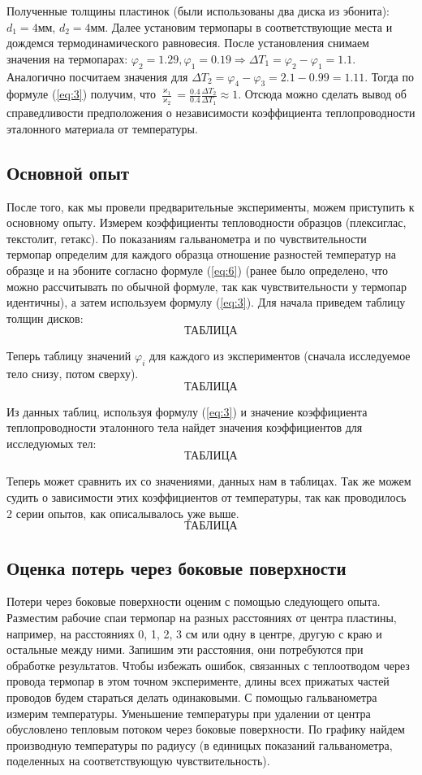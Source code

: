 \documentclass[a4paper,11.5pt]{article} %
\begin{document}
Полученные толщины пластинок (были использованы два диска из эбонита): $d_1 = 4 \textbf{мм}$, $d_2 = 4 \textbf{мм}$. Далее установим термопары в соответствующие места и дождемся термодинамического равновесия. После установления снимаем значения на термопарах: $\varphi_2 = 1.29, \varphi_1 = 0.19 \Rightarrow \Delta T_1 = \varphi_2 - \varphi_1 = 1.1$. Аналогично посчитаем значения для $\Delta T_2 = \varphi_4 - \varphi_3 = 2.1 - 0.99 = 1.11$. Тогда по формуле (\ref{eq:3}) получим, что $\frac{\varkappa_1}{\varkappa_2} = \frac{0.4}{0.4}\frac{\Delta T_2}{\Delta T_1} \approx 1.$ Отсюда можно сделать вывод об справедливости предположения о независимости коэффициента теплопроводности эталонного материала от температуры.  
\subsection{Основной опыт}
После того, как мы провели предварительные эксперименты, можем приступить к основному опыту. Измерем коэффициенты тепловодности образцов (плексиглас, текстолит, гетакс). По показаниям гальванометра и по чувствительности термопар определим для каждого образца отношение разностей температур на образце и на эбоните согласно формуле (\ref{eq:6}) (ранее было определено, что можно рассчитывать по обычной формуле, так как чувствительности у термопар идентичны), а затем используем формулу (\ref{eq:3}).
Для начала приведем таблицу толщин дисков:
\[\textbf{ТАБЛИЦА}\]

Теперь таблицу значений $\varphi_i$ для каждого из экспериментов (сначала исследуемое тело снизу, потом сверху).
\[\textbf{ТАБЛИЦА}\]

Из данных таблиц, используя формулу (\ref{eq:3}) и значение коэффициента теплопроводности эталонного тела найдет значения коэффициентов для исследуюмых тел:
\[\textbf{ТАБЛИЦА}\]

Теперь может сравнить их со значениями, данных нам в таблицах. Так же можем судить о зависимости этих коэффициентов от температуры, так как проводилось 2 серии опытов, как описалывалось уже выше.
\[\textbf{ТАБЛИЦА}\]


\subsection{Оценка потерь через боковые поверхности}
Потери через боковые поверхности оценим с помощью следующего опыта. Разместим рабочие спаи термопар на разных расстояниях от центра пластины, например, на расстояниях 0, 1, 2, 3 см или одну в центре, другую с краю и остальные между ними. Запишим эти расстояния, они потребуются при обработке результатов. Чтобы избежать ошибок, связанных с теплоотводом через провода термопар в этом точном эксперименте, длины всех прижатых частей проводов будем стараться делать одинаковыми. С помощью гальванометра измерим температуры. Уменьшение температуры при удалении от центра обусловлено тепловым потоком через боковые поверхности. По графику найдем производную температуры по радиусу (в единицых показаний гальванометра, поделенных на соответствующую чувствительность).
\end{document}
